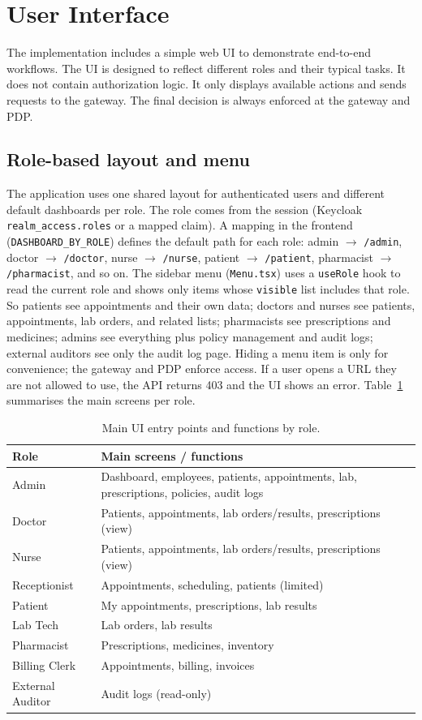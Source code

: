 \section{User Interface}
The implementation includes a simple web UI to demonstrate end-to-end workflows. The UI is designed to reflect
different roles and their typical tasks. It does not contain authorization logic. It only displays available actions
and sends requests to the gateway. The final decision is always enforced at the gateway and PDP.


\subsection{Role-based layout and menu}
The application uses one shared layout for authenticated users and different default dashboards per role. The role comes from the session (Keycloak \texttt{realm\_access.roles} or a mapped claim). A mapping in the frontend (\texttt{DASHBOARD\_BY\_ROLE}) defines the default path for each role: admin $\to$ \texttt{/admin}, doctor $\to$ \texttt{/doctor}, nurse $\to$ \texttt{/nurse}, patient $\to$ \texttt{/patient}, pharmacist $\to$ \texttt{/pharmacist}, and so on. The sidebar menu (\texttt{Menu.tsx}) uses a \texttt{useRole} hook to read the current role and shows only items whose \texttt{visible} list includes that role. So patients see appointments and their own data; doctors and nurses see patients, appointments, lab orders, and related lists; pharmacists see prescriptions and medicines; admins see everything plus policy management and audit logs; external auditors see only the audit log page. Hiding a menu item is only for convenience; the gateway and PDP enforce access. If a user opens a URL they are not allowed to use, the API returns 403 and the UI shows an error. Table~\ref{tab:role-ui} summarises the main screens per role.

\begin{table}[H]
\centering
\begin{tabular}{|l|l|}
\hline
\textbf{Role} & \textbf{Main screens / functions} \\
\hline
Admin & Dashboard, employees, patients, appointments, lab, prescriptions, policies, audit logs \\
\hline
Doctor & Patients, appointments, lab orders/results, prescriptions (view) \\
\hline
Nurse & Patients, appointments, lab orders/results, prescriptions (view) \\
\hline
Receptionist & Appointments, scheduling, patients (limited) \\
\hline
Patient & My appointments, prescriptions, lab results \\
\hline
Lab Tech & Lab orders, lab results \\
\hline
Pharmacist & Prescriptions, medicines, inventory \\
\hline
Billing Clerk & Appointments, billing, invoices \\
\hline
External Auditor & Audit logs (read-only) \\
\hline
\end{tabular}
\caption{Main UI entry points and functions by role.}
\label{tab:role-ui}
\end{table}

